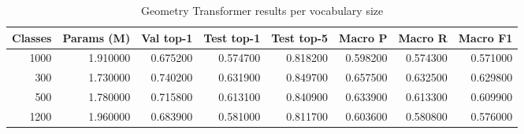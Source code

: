 \begin{table}[htbp]
\caption{Geometry Transformer results per vocabulary size}
\label{tab:table02_vocabulary_scaling}
\begin{tabular}{rrrrrrrr}
\toprule
Classes & Params (M) & Val top-1 & Test top-1 & Test top-5 & Macro P & Macro R & Macro F1 \\
\midrule
1000 & 1.910000 & 0.675200 & 0.574700 & 0.818200 & 0.598200 & 0.574300 & 0.571000 \\
300 & 1.730000 & 0.740200 & 0.631900 & 0.849700 & 0.657500 & 0.632500 & 0.629800 \\
500 & 1.780000 & 0.715800 & 0.613100 & 0.840900 & 0.633900 & 0.613300 & 0.609900 \\
1200 & 1.960000 & 0.683900 & 0.581000 & 0.811700 & 0.603600 & 0.580800 & 0.576000 \\
\bottomrule
\end{tabular}
\end{table}
